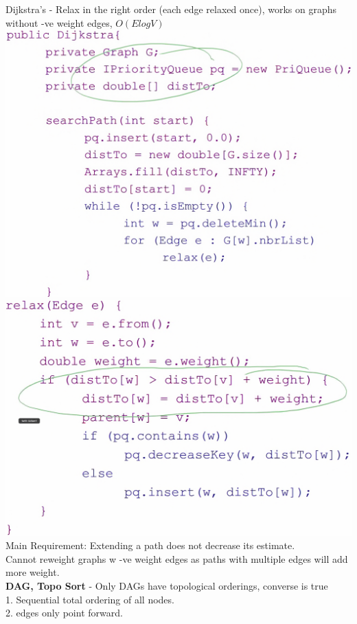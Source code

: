 \documentclass[10pt, a4paper]{article}
\begin{document}
\begin{multicols*}{3}
		Dijkstra's - Relax in the right order (each edge relaxed once), works on graphs without -ve weight edges, $O(ElogV)$\\
		\includegraphics[scale=.09]{Dijkstra}
		\includegraphics[scale=.09]{Dijkstra2}\\
		Main Requirement: Extending a path does not decrease its estimate.\\
		Cannot reweight graphs w -ve weight edges as paths with multiple edges will add more weight.\\
		\textbf{DAG, Topo Sort} - Only DAGs have topological orderings, converse is true\\
		1. Sequential total ordering of all nodes.\\
		2. edges only point forward.\\

\end{multicols*}
\end{document}
